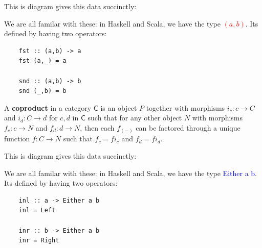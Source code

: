 \documentclass[tikz]{beamer}
\newcommand{\cat}[1]{\bm{ \mathsf{#1} }}
\newcommand{\cc}{\cat{C}}
\newcommand{\mred}[1]{\textcolor{red}{$#1$}}
\newcommand{\blue}[1]{\textcolor{blue}{#1}}
\theoremstyle{definition}
\begin{document}
\begin{frame}[fragile]
	This is diagram gives this data succinctly: 
	
	\begin{center}
	\end{center}
\end{frame}

\begin{frame}[fragile]
	We are all familar with these: in Haskell and Scala, we have the type \mred{(a, b)}. Its defined by having two operators: 
	
	\begin{verbatim}
	fst :: (a,b) -> a
	fst (a,_) = a
	
	snd :: (a,b) -> b
	snd (_,b) = b
	\end{verbatim}
\end{frame}

\frame
{ 
	\begin{definition}[Coproduct]
	
		A \textbf{coproduct} in a category $\cc$ is an object $P$ together with morphisms $i_c : c \to C $ and $i_d : C \to d$ for $c,d$ in $\cc$ such that for any other object $N$ with morphisms $f_c : c \to N$ and $f_d : d \to N$, then each $f_{(-)}$ can be factored through a unique function $f : C \to N$ such that $f_c = fi_c$ and $f_d = fi_d$. 
	\end{definition}
	
}

\begin{frame}[fragile]
	This is diagram gives this data succinctly: 
	
	\begin{center}
	\end{center}
\end{frame}

\begin{frame}[fragile]
	We are all familar with these: in Haskell and Scala, we have the type \blue{Either} \blue{a} \blue{b}. Its defined by having two operators: 
	
	\begin{verbatim}
	inl :: a -> Either a b
	inl = Left
	
	inr :: b -> Either a b
	inr = Right
	\end{verbatim}
\end{frame}
\end{document}
